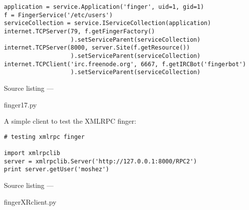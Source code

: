 \begin{verbatim}
application = service.Application('finger', uid=1, gid=1)
f = FingerService('/etc/users')
serviceCollection = service.IServiceCollection(application)
internet.TCPServer(79, f.getFingerFactory()
                   ).setServiceParent(serviceCollection)
internet.TCPServer(8000, server.Site(f.getResource())
                   ).setServiceParent(serviceCollection)
internet.TCPClient('irc.freenode.org', 6667, f.getIRCBot('fingerbot')
                   ).setServiceParent(serviceCollection)
\end{verbatim}\parbox[b]{\linewidth}{\begin{center}Source listing --- \begin{em}finger17.py\end{em}\end{center}}

A simple client to test the XMLRPC finger:\begin{verbatim}
# testing xmlrpc finger

import xmlrpclib
server = xmlrpclib.Server('http://127.0.0.1:8000/RPC2')
print server.getUser('moshez')
\end{verbatim}\parbox[b]{\linewidth}{\begin{center}Source listing --- \begin{em}fingerXRclient.py\end{em}\end{center}}